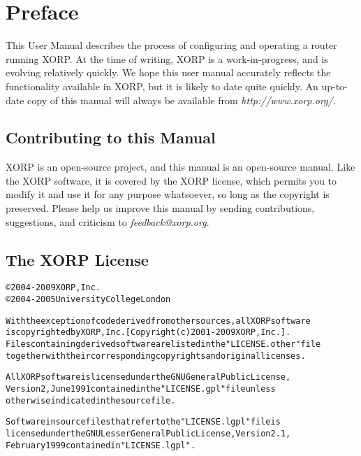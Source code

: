 %
%

\chapter*{Preface}

\vspace{-0.1in}
This User Manual describes the process of configuring and operating a
router running XORP.  At the time of writing, XORP is a
work-in-progress, and is evolving relatively quickly.  We hope this
user manual accurately reflects the functionality available in XORP,
but it is likely to date quite quickly.  An up-to-date copy of this
manual will always be available from {\it http://www.xorp.org/}.

\section*{Contributing to this Manual}
\vspace{-0.1in}
XORP is an open-source project, and this manual is an open-source
manual.  Like the XORP software, it is covered by the XORP license,
which permits you to modify it and use it for any purpose whatsoever,
so long as the copyright is preserved.  Please help us improve this
manual by sending contributions, suggestions, and criticism to {\it
  feedback@xorp.org}.

\section*{The XORP License}
\vspace{-0.3in}
\begin{alltt}
\small\noindent
\copyright 2004-2009 XORP, Inc.
\copyright 2004-2005 University College London

With the exception of code derived from other sources, all XORP software
is copyrighted by XORP, Inc. [Copyright (c) 2001-2009 XORP, Inc.].
Files containing derived software are listed in the "LICENSE.other" file
together with their corresponding copyrights and original licenses.

All XORP software is licensed under the GNU General Public License,
Version 2, June 1991 contained in the "LICENSE.gpl" file unless
otherwise indicated in the source file.

Software in source files that refer to the "LICENSE.lgpl" file is
licensed under the GNU Lesser General Public License, Version 2.1,
February 1999 contained in "LICENSE.lgpl".
\end{alltt}

